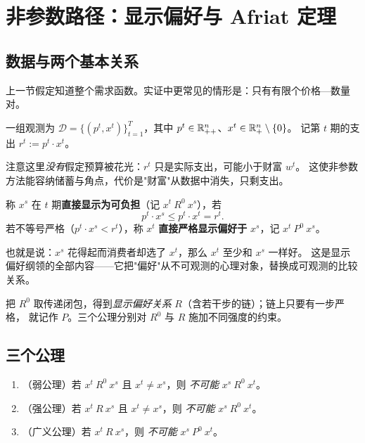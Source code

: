 \section{非参数路径：显示偏好与 Afriat 定理}

\subsection{数据与两个基本关系}

上一节假定知道整个需求函数。实证中更常见的情形是：只有有限个价格—数量对。

\begin{definition}[观测数据]\label{def:data}
一组观测为 $\mathcal D=\{(p^t,x^t)\}_{t=1}^{T}$，其中 $p^t\in\mathbb{R}^n_{++}$、$x^t\in\mathbb{R}^n_+\setminus\{0\}$。
记第 $t$ 期的支出 $r^t:=p^t\cdot x^t$。
\end{definition}

注意这里\emph{没有}假定预算被花光：$r^t$ 只是实际支出，可能小于财富 $w^t$。
这使非参数方法能容纳储蓄与角点，代价是"财富"从数据中消失，只剩支出。

\begin{definition}[直接显示偏好]\label{def:direct-rp}
称 $x^s$ 在 $t$ 期\textbf{直接显示为可负担}（记 $x^t\ R^0\ x^s$），若
\[
 p^t\cdot x^s\le p^t\cdot x^t=r^t .
\]
若不等号严格（$p^t\cdot x^s<r^t$），称 $x^t$ \textbf{直接严格显示偏好于} $x^s$，记 $x^t\ P^0\ x^s$。
\end{definition}

也就是说：$x^s$ 花得起而消费者却选了 $x^t$，那么 $x^t$ 至少和 $x^s$ 一样好。
这是显示偏好纲领的全部内容——它把"偏好"从不可观测的心理对象，替换成可观测的比较关系。

把 $R^0$ 取传递闭包，得到\emph{显示偏好关系} $R$（含若干步的链）；链上只要有一步严格，
就记作 $P$。三个公理分别对 $R^0$ 与 $R$ 施加不同强度的约束。

\subsection{三个公理}

\begin{definition}\label{def:axioms}
\begin{enumerate}
\item[\textbf{WARP}]（弱公理）若 $x^t\ R^0\ x^s$ 且 $x^t\ne x^s$，则 \emph{不可能} $x^s\ R^0\ x^t$。
\item[\textbf{SARP}]（强公理）若 $x^t\ R\ x^s$ 且 $x^t\ne x^s$，则 \emph{不可能} $x^s\ R^0\ x^t$。
\item[\textbf{GARP}]（广义公理）若 $x^t\ R\ x^s$，则 \emph{不可能} $x^s\ P^0\ x^t$。
\end{enumerate}
\end{definition}

